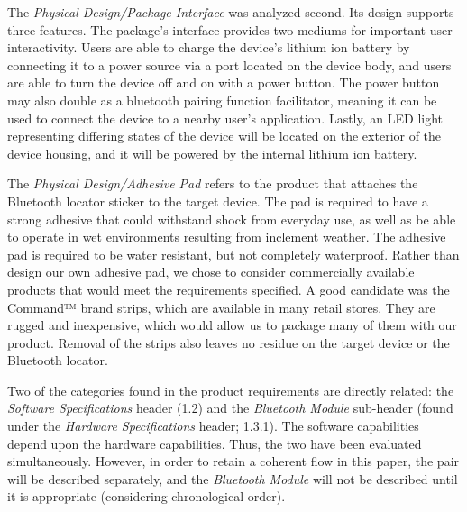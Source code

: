 \documentclass[12pt]{article}
\begin{document}
The \emph{Physical Design/Package Interface} was analyzed second. Its design supports three features. The package’s interface provides two mediums for important user interactivity. Users are able to charge the device’s lithium ion battery by connecting it to a power source via a port located on the device body, and users are able to turn the device off and on with a power button. The power button may also double as a bluetooth pairing function facilitator, meaning it can be used to connect the device to a nearby user’s application. Lastly, an LED light representing differing states of the device will be located on the exterior of the device housing, and it will be powered by the internal lithium ion battery.


The \emph{Physical Design/Adhesive Pad} refers to the product that attaches the Bluetooth locator sticker to the target device. The pad is required to have a strong adhesive that could withstand shock from everyday use, as well as be able to operate in wet environments resulting from inclement weather. The adhesive pad is required to be water resistant, but not completely waterproof. Rather than design our own adhesive pad, we chose to consider commercially available products that would meet the requirements specified. A good candidate was the Command™ brand strips, which are available in many retail stores. They are rugged and inexpensive, which would allow us to package many of them with our product. Removal of the strips also leaves no residue on the target device or the Bluetooth locator.


Two of the categories found in the product requirements are directly related: the \emph{Software Specifications} header (1.2) and the \emph{Bluetooth Module} sub-header (found under the \emph{Hardware Specifications} header; 1.3.1). The software capabilities depend upon the hardware capabilities. Thus, the two have been evaluated simultaneously. However, in order to retain a coherent flow in this paper, the pair will be described separately, and the \emph{Bluetooth Module} will not be described until it is appropriate (considering chronological order). 
\end{document}
